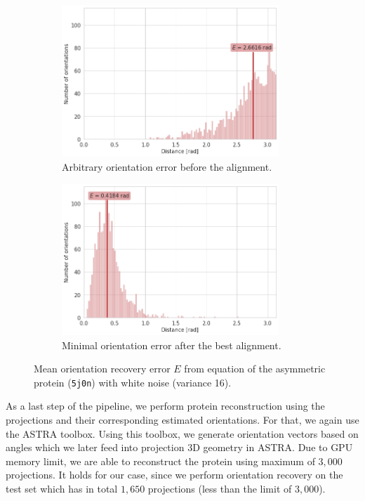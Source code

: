 \begin{figure}[ht!]
    \centering
    \begin{subfigure}[b]{0.45\textwidth}
        \includegraphics[height=5.7cm]{images/5j0n_noise16_angle_alignment_before.png}
        \caption{Arbitrary orientation error before the alignment.}
    \end{subfigure}
    \hfill
    \begin{subfigure}[b]{0.5\textwidth}
    \centering
        \includegraphics[height=5.7cm]{images/5j0n_noise16_angle_alignment_after.png}
        \caption{Minimal orientation error after the best alignment.}
    \end{subfigure}
    \caption{
        Mean orientation recovery error $E$ from equation  of the asymmetric protein (\texttt{5j0n}) with white noise (variance 16).
}
    \label{fig:angle-alignment-5j0n-noise16}
\end{figure}

As a last step of the pipeline, we perform protein reconstruction using the projections and their corresponding estimated orientations.
For that, we again use the ASTRA toolbox.
Using this toolbox, we generate orientation vectors based on angles which we later feed into projection 3D geometry in ASTRA. 
Due to GPU memory limit, we are able to reconstruct the protein using maximum of $3,000$ projections.
It holds for our case, since we perform orientation recovery on the test set which has in total $1,650$ projections (less than the limit of $3,000$).

